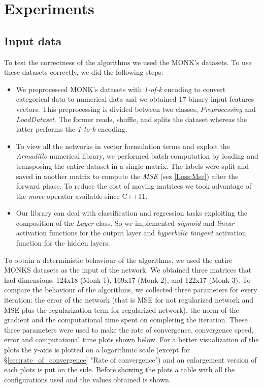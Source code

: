 \section{Experiments}

\subsection{Input data}
To test the correctness of the algorithms we used the MONK's datasets. To use these datasets correctly, we did the following steps:
\begin{itemize}
	\item We preprocessed MONK's datasets with \textit{1-of-k} encoding to convert categorical data to numerical data and we obtained 17 binary input features vectors. This preprocessing is divided between two classes, \textit{Preprocessing} and \textit{LoadDataset}. The former reads, shuffle, and splits the dataset whereas the latter performs the \textit{1-to-k} encoding. 
	\item To view all the networks in vector formulation terms and exploit the \textit{Armadillo} numerical library, we performed batch computation by loading and transposing the entire dataset in a single matrix. The labels were split and saved in another matrix to compute the \textit{MSE} (sez \ref{Loss:Mse}) after the forward phase. To reduce the cost of moving matrices we took advantage of the \textit{move} operator available since C++11. 
	\item Our library can deal with classification and regression tasks exploiting the composition of the \textit{Layer} class.  So we implemented \textit{sigmoid} and \textit{linear} activation functions for the output layer and \textit{hyperbolic tangent} activation function for the hidden layers.
\end{itemize}



To obtain a deterministic behaviour of the algorithms, we used the entire MONKS datasets as the input of the network. We obtained three matrices that had dimensions: 124x18 (Monk 1), 169x17 (Monk 2), and 122x17 (Monk 3). To compare the behaviour of the algorithms, we collected three parameters for every iteration: the error of the network (that is MSE for not regularized network and MSE plus the regularization term for regularized network), the norm of the gradient and the computational time spent on completing the iteration. These three parameters were used to make the rate of convergence, convergence speed, error and computational time plots shown below. For a better visualization of the plots the y-axis is plotted on a logarithmic scale (except for \S \ref{sec:rate_of_convergence} "Rate of convergence") and an enlargement version of each plots is put on the side. Before showing the plots a table with all the configurations used and the values obtained is shown.


